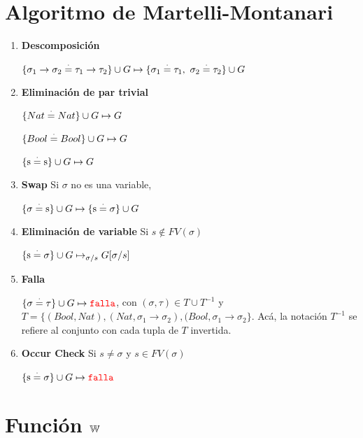\documentclass[10pt,a4paper]{article}
\begin{document}
\section{Algoritmo de Martelli-Montanari}
\begin{enumerate}
\item \textbf{Descomposición}

$\{\sigma_1\to\sigma_2 \overset{\cdot}{=}\tau_1\to\tau_2\}\cup G\mapsto \{\sigma_1\overset{\cdot}{=}\tau_1,~\sigma_2 \overset{\cdot}{=}\tau_2\}\cup G$
\item \textbf{Eliminación de par trivial}

$\{ Nat \overset{\cdot}{=} Nat\}\cup G\mapsto G$

$\{ Bool \overset{\cdot}{=} Bool\}\cup G\mapsto G$

$\{\text{s} \overset{\cdot}{=}\text{s}\}\cup G\mapsto G$
\item \textbf{Swap} Si $\sigma$ no es una variable,

$\{\sigma \overset{\cdot}{=}\text{s}\}\cup G\mapsto \{\text{s}\overset{\cdot}{=}\sigma\}\cup G$

\item \textbf{Eliminación de variable} Si $s\notin FV(\sigma)$

$\{\text{s}\overset{\cdot}{=}\sigma\}\cup G\mapsto_{\sigma/s} G[\sigma/s]$

\item \textbf{Falla}

$\{\sigma\overset{\cdot}{=}\tau\}\cup G\mapsto {\color{red}\texttt{falla}}$, con $(\sigma,\tau)\in T\cup T^{-1}$ y $T =\{( Bool, Nat), (Nat, \sigma_1\to\sigma_2), ( Bool, \sigma_1\to\sigma_2\}$. Acá, la notación $T^{-1}$ se refiere al conjunto con cada tupla de $T$ invertida.

\item \textbf{Occur Check} Si $s\neq\sigma$ y $s\in FV(\sigma)$

$\{\text{s}\overset{\cdot}{=}\sigma\}\cup G\mapsto {\color{red}\texttt{falla}}$
\end{enumerate}

\section{Función $\mathbb{W}$}
\end{document}
